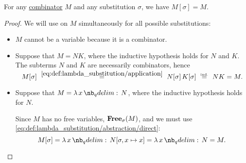 \begin{proposition}\label{thm:lambda_substitution_combinators}
  For any \hyperref[def:lambda_combinator]{combinator} \( M \) and any substitution \( \sigma \), we have \( M[\sigma] = M \).
\end{proposition}
\begin{proof}
  We will use  on \( M \) simultaneously for all possible substitutions:
  \begin{itemize}
    \item \( M \) cannot be a variable because it is a combinator.
    \item Suppose that \( M = NK \), where the inductive hypothesis holds for \( N \) and \( K \). The subterms \( N \) and \( K \) are necessarily combinators, hence
    \begin{equation*}
      M[\sigma]
      \reloset {\eqref{eq:def:lambda_substitution/application}} =
      N[\sigma] \thinspace K[\sigma]
      \reloset {\T{ind.}} =
      N K
      =
      M.
    \end{equation*}

    \item Suppose that \( M = \qabs x N \), where the inductive hypothesis holds for \( N \).

    Since \( M \) has no free variables, \( \op*{Free}_\sigma(M) \), and we must use \eqref{eq:def:lambda_substitution/abstraction/direct}:
    \begin{equation*}
      M[\sigma] = \qabs x N[\sigma, x \mapsto x] = \qabs x N = M.
    \end{equation*}
  \end{itemize}
\end{proof}

